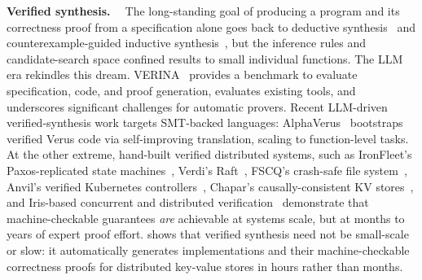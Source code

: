 \textbf{Verified synthesis. \ }
The long-standing goal of producing a program and its correctness proof from a specification alone goes back to deductive synthesis~\cite{manna-waldinger,synquid} and counterexample-guided inductive synthesis~\cite{sketch,cegis}, but the inference rules and candidate-search space confined results to small individual functions.
The LLM era rekindles this dream.
VERINA~\cite{verina} provides a benchmark to evaluate specification, code, and proof generation, evaluates existing tools, and underscores significant challenges for automatic provers.
Recent LLM-driven verified-synthesis work targets SMT-backed languages: AlphaVerus~\cite{alphaverus} bootstraps verified Verus code via self-improving translation, scaling to function-level tasks.
%
At the other extreme,
hand-built verified distributed systems, such as IronFleet's Paxos-replicated state machines~\cite{ironfleet}, Verdi's Raft~\cite{verdi}, FSCQ's crash-safe file system~\cite{fscq}, Anvil's verified Kubernetes controllers~\cite{anvil}, Chapar's causally-consistent KV stores~\cite{chapar}, and Iris-based concurrent and distributed verification~\cite{iris,grove,perennial} demonstrate that machine-checkable guarantees \emph{are} achievable at systems scale, but at months to years of expert proof effort.
\sys{} shows that verified synthesis need not be small-scale or slow: it automatically generates implementations and their machine-checkable correctness proofs for distributed key-value stores in hours rather than months.






